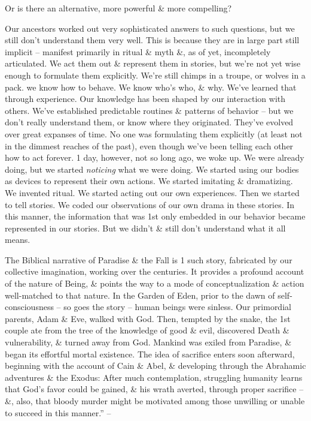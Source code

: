 \documentclass{article}
\begin{document}
Or is there an alternative, more powerful \& more compelling?

Our ancestors worked out very sophisticated answers to such questions, but we still don't understand them very well. This is because they are in large part still implicit -- manifest primarily in ritual \& myth \&, as of yet, incompletely articulated. We act them out \& represent them in stories, but we're not yet wise enough to formulate them explicitly. We're still chimps in a troupe, or wolves in a pack. we know how to behave. We know who's who, \& why. We've learned that through experience. Our knowledge has been shaped by our interaction with others. We've established predictable routines \& patterns of behavior -- but we don't really understand them, or know where they originated. They've evolved over great expanses of time. No one was formulating them explicitly (at least not in the dimmest reaches of the past), even though we've been telling each other how to act forever. 1 day, however, not so long ago, we woke up. We were already doing, but we started \textit{noticing} what we were doing. We started using our bodies as devices to represent their own actions. We started imitating \& dramatizing. We invented ritual. We started acting out our own experiences. Then we started to tell stories. We coded our observations of our own drama in these stories. In this manner, the information that was 1st only embedded in our behavior became represented in our stories. But we didn't \& still don't understand what it all means.

The Biblical narrative of Paradise \& the Fall is 1 such story, fabricated by our collective imagination, working over the centuries. It provides a profound account of the nature of Being, \& points the way to a mode of conceptualization \& action well-matched to that nature. In the Garden of Eden, prior to the dawn of self-consciousness -- so goes the story -- human beings were sinless. Our primordial parents, Adam \& Eve, walked with God. Then, tempted by the snake, the 1st couple ate from the tree of the knowledge of good \& evil, discovered Death \& vulnerability, \& turned away from God. Mankind was exiled from Paradise, \& began its effortful mortal existence. The idea of sacrifice enters soon afterward, beginning with the account of Cain \& Abel, \& developing through the Abrahamic adventures \& the Exodus: After much contemplation, struggling humanity learns that God's favor could be gained, \& his wrath averted, through proper sacrifice -- \&, also, that bloody murder might be motivated among those unwilling or unable to succeed in this manner.'' -- \cite[pp. 183--185]{Peterson2018}
\end{document}

